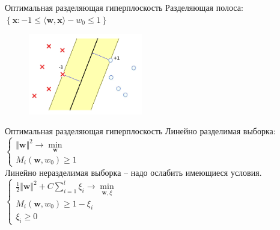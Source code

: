 \documentclass[12pt]{beamer}
\begin{document}
\begin{frame}{Оптимальная разделяющая гиперплоскость}
	Разделяющая полоса: $\left\{\mathbf{x}: -1 \leq \langle \mathbf{w}, \mathbf{x}\rangle - w_0 \leq 1\right\}$\\
	\begin{figure}[htbp]
	  \includegraphics[height=100pt, keepaspectratio = true]{images/linearly_separable2}   
	\end{figure}
\end{frame}

\begin{frame}{Оптимальная разделяющая гиперплоскость}
	Линейно разделимая выборка:\\
	$\begin{cases}
		{\Vert \mathbf{w} \Vert^2 \rightarrow \min\limits_{\mathbf{w}}}\\
		M_i(\mathbf{w}, w_0) \geq 1
	\end{cases}$\\
	\pause
	\bigbreak
	Линейно неразделимая выборка -- надо ослабить имеющиеся условия.\\
	$\begin{cases}
		{\frac{1}{2}\Vert \mathbf{w} \Vert^2 + C \sum\limits_{i=1}^l \xi_i \rightarrow \min\limits_{\mathbf{w}, \xi}}\\
		M_i(\mathbf{w}, w_0) \geq 1 - \xi_i\\
		\xi_i \geq 0
	\end{cases}$\\
\end{frame}
\end{document}
